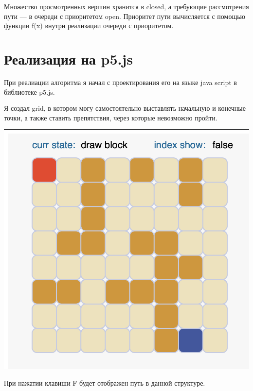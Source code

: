 Множество просмотренных вершин хранится в closed, а требующие рассмотрения пути — в очереди с приоритетом open. Приоритет пути вычисляется с помощью функции f(x) внутри реализации очереди с приоритетом.

\section{Реализация на p5.js}

При реалиации алгоритма я начал с проектирования его на языке java script в библиотеке p5.js.

Я создал grid, в котором могу самостоятельно выставлять начальную и конечные точки, а также ставить препятствия, через которые невозможно пройти.

\includegraphics[scale=0.75]{pictures/1.png}

При нажатии клавиши F будет отображен путь в данной структуре.

